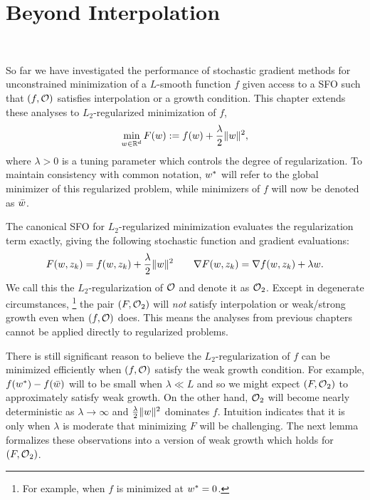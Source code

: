 
\chapter{Beyond Interpolation}~\label{ch:beyond-interpolation}

So far we have investigated the performance of stochastic gradient methods for unconstrained minimization of a \( L \)-smooth function \( f \) given access to a \ac{SFO} \oracle{} such that \( \rbr{f, \oracle{}} \) satisfies interpolation or a growth condition. 
This chapter extends these analyses to \( L_2 \)-regularized minimization of \( f \), 
\begin{align}
    \min_{\w \in \R^d} F(\w) := f(\w) + \frac{\lambda}{2} \norm{\w}^2,\label{eq:l2-reguarlized-problem}
\end{align}
where \( \lambda > 0 \) is a tuning parameter which controls the degree of regularization. 
To maintain consistency with common notation, \( \wopt \) will refer to the global minimizer of this regularized problem, while minimizers of \( f \) will now be denoted as \( \wbar \).

The canonical \ac{SFO} for \( L_2 \)-regularized minimization evaluates the regularization term exactly, giving the following stochastic function and gradient evaluations: 
\[ F(\w, \zk) = f(\w, \zk) + \frac{\lambda}{2} \norm{\w}^2 \quad \quad \nabla F(\w, \zk) = \grad(\w, \zk) + \lambda \w.  \]
We call this the \( L_2 \)-regularization of \( \oracle{} \) and denote it as \( \oracle{}_2 \).
Except in degenerate circumstances,%
\footnote{For example, when \( f \) is minimized at \( \wopt = 0 \).}%
the pair \( \rbr{F, \oracle{}_2} \) will \emph{not} satisfy interpolation or weak/strong growth even when \( \rbr{f, \oracle{}} \) does. 
This means the analyses from previous chapters cannot be applied directly to regularized problems.

There is still significant reason to believe the \( L_2 \)-regularization of \( f \) can be minimized efficiently when \( \rbr{f, \oracle{}} \) satisfy the weak growth condition.
For example, \( f(\wopt) - f(\wbar) \) will to be small when \( \lambda \ll L \) and so we might expect \( \rbr{F, \oracle{}_2} \) to approximately satisfy weak growth. 
On the other hand, \( \oracle{}_2 \) will become nearly deterministic as \( \lambda \rightarrow \infty \) and \( \frac{\lambda}{2} \norm{\w}^2 \) dominates \( f \).
Intuition indicates that it is only when \( \lambda \) is moderate that minimizing \( F \) will be challenging.
The next lemma formalizes these observations into a version of weak growth which holds for \( \rbr{F, \oracle{}_2} \).

